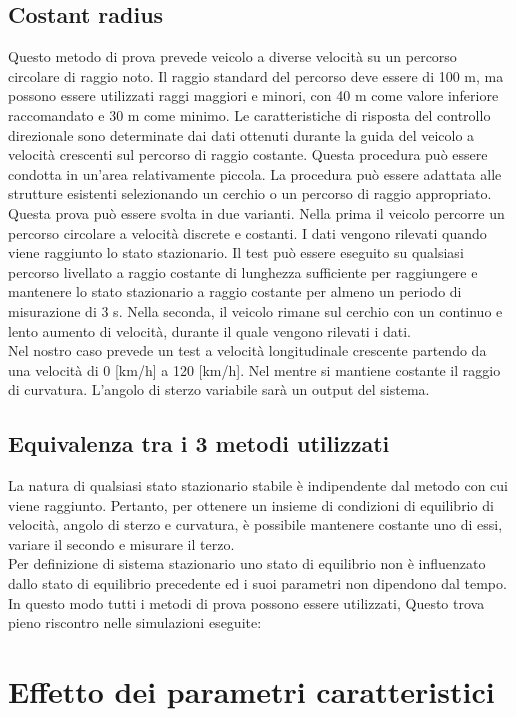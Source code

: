 \subsection{Costant radius}
Questo metodo di prova prevede  veicolo a diverse velocità su un percorso circolare di raggio noto. Il raggio standard del percorso deve essere di 100 m, ma possono essere utilizzati raggi maggiori e minori, con 40 m come valore inferiore raccomandato e 30 m come minimo.
Le caratteristiche di risposta del controllo direzionale sono determinate dai dati ottenuti durante la guida del veicolo a velocità crescenti sul percorso di raggio costante. Questa procedura può essere condotta in un'area relativamente piccola. La procedura può essere adattata alle strutture esistenti selezionando un cerchio o un percorso di raggio appropriato.
\\Questa prova può essere svolta in due varianti. Nella prima il veicolo percorre un percorso circolare a velocità discrete e costanti. I dati vengono rilevati quando viene raggiunto lo stato stazionario. Il test può essere eseguito su qualsiasi percorso livellato a raggio costante di lunghezza sufficiente per raggiungere e mantenere lo stato stazionario a raggio costante per almeno un periodo di misurazione di 3 s. Nella seconda, il veicolo rimane sul cerchio con un continuo e lento aumento di velocità, durante il quale vengono rilevati i dati.
\\Nel nostro caso prevede un test a velocità longitudinale crescente partendo da una velocità di 0 [km/h] a 120 [km/h].
Nel mentre si mantiene costante il raggio di curvatura.
L'angolo di sterzo variabile sarà un output del sistema.

\subsection{Equivalenza tra i 3 metodi utilizzati}
La natura di qualsiasi stato stazionario stabile è indipendente dal metodo con cui viene raggiunto. Pertanto, per ottenere
un insieme  di condizioni di equilibrio di velocità, angolo di sterzo e curvatura, è possibile mantenere costante uno di
essi, variare il secondo e misurare il terzo.\\ 
Per definizione di sistema stazionario uno stato di equilibrio non è influenzato dallo stato di equilibrio precedente ed i
suoi parametri non dipendono dal tempo. 
In questo modo tutti i metodi di prova possono essere utilizzati, Questo trova pieno riscontro nelle simulazioni eseguite:\\

\section{Effetto dei parametri caratteristici}

